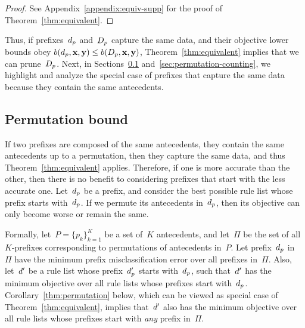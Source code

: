 \begin{arxiv}
\begin{proof}
See Appendix~\ref{appendix:equiv-supp} for the proof of Theorem~\ref{thm:equivalent}.
\end{proof}
\end{arxiv}

Thus, if prefixes~$d_p$ and~$D_p$ capture the same data,
and their objective lower bounds obey
${b(d_p, \mathbf{x}, \mathbf{y}) \le b(D_p, \mathbf{x}, \mathbf{y})}$,
Theorem~\ref{thm:equivalent} implies that we can prune~$D_p$.
%
%
Next, in Sections~\ref{sec:permutation} and~\ref{sec:permutation-counting},
we highlight and analyze the special case of prefixes that capture
the same data because they contain the same antecedents.

\subsection{Permutation bound}%
\label{sec:permutation}

If two prefixes are composed of the same antecedents,
\ie they contain the same antecedents up to a permutation,
then they capture the same data, and thus Theorem~\ref{thm:equivalent} applies.
%
Therefore, if one is more accurate than the other, then there is no benefit to
considering prefixes that start with the less accurate one.
%
Let~$d_p$ be a prefix,
and consider the best possible rule list whose prefix starts with~$d_p$.
%
If we permute its antecedents in~$d_p$,
then its objective can only become worse or remain the same.

Formally, let~${P = \{p_k\}_{k=1}^K}$ be a set of~$K$ antecedents,
and let~$\Pi$ be the set of all $K$-prefixes corresponding to
permutations of antecedents in~$P$.
%
Let prefix~$d_p$ in~$\Pi$ have the minimum prefix misclassification
error over all prefixes in~$\Pi$.
%
Also, let~${d}'$ be a rule list whose prefix~$d_p'$
starts with~$d_p$, such that~${d}'$ has the minimum objective
over all rule lists whose prefixes start with~$d_p$.
%
Corollary~\ref{thm:permutation} below,
which can be viewed as special case of Theorem~\ref{thm:equivalent},
implies that~${d}'$ also has the minimum objective over all
rule lists whose prefixes start with \emph{any} prefix in~$\Pi$.

